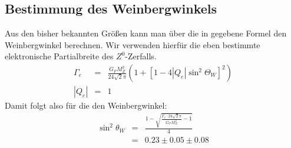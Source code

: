 \subsection{Bestimmung des Weinbergwinkels}
Aus den bisher bekannten Größen kann man über die in \cite[Gl.6]{script} gegebene Formel den Weinbergwinkel berechnen. Wir verwenden hierfür die eben bestimmte elektronische Partialbreite des $Z^0$-Zerfalls.
\begin{eqnarray}
\Gamma_e &=& \frac{G_F M_Z^3}{24 \sqrt{2}\pi}\left(1+[1-4|Q_e|\sin^2\Theta_W]^2\right)\\
|Q_e| &=& 1
\end{eqnarray}
Damit folgt also für die den Weinbergwinkel:
\begin{eqnarray}
\sin^2\theta_W &=& \frac{1-\sqrt{\frac{\Gamma_e\cdot 24\sqrt{2}\pi}{G_FM_Z^3}-1}}{4}\\
&=& 0.23 \pm 0.05 \pm 0.08
\end{eqnarray}